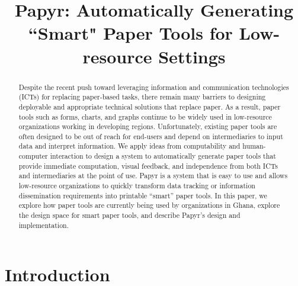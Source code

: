 \documentclass{sig-alternate}
\begin{document}
\newcommand{\nifty}{\textsf{Papyr}\xspace}

\title{Papyr: Automatically Generating ``Smart" Paper Tools for Low-resource Settings}
\author{}
\maketitle

\begin{abstract}
Despite the recent push toward leveraging information and communication technologies (ICTs) for replacing paper-based tasks, there remain many barriers to designing deployable and appropriate technical solutions that replace paper.
As a result, paper tools such as forms, charts, and graphs continue to be widely used in low-resource organizations working in developing regions.
Unfortunately, existing paper tools are often designed to be out of reach for end-users and depend on intermediaries to input data and interpret information. 
We apply ideas from computability and human-computer interaction to design a system to automatically generate paper tools that provide immediate computation, visual feedback, and independence from both ICTs and intermediaries at the point of use. 
\nifty is a system that is easy to use and allows low-resource organizations to quickly transform data tracking or information dissemination requirements into printable ``smart'' paper tools. 
In this paper, we explore how paper tools are currently being used by organizations in Ghana, explore the design space for smart paper tools, and describe \nifty's design and implementation.

\end{abstract}



\section{Introduction}

\end{document}

